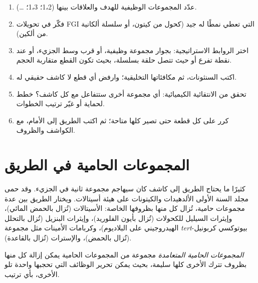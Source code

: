 \begin{method}\label{met:b2:retrosynthesis:retrosynthesis}
\begin{enumerate}
  \item عدّد المجموعات الوظيفية للهدف والعلاقات بينها (1،2؛ 1،3؛ \dots).
  \item فكّر في تحويلات FGI التي تعطي نمطًا له  جيد (كحول من كيتون، أو
        سلسلة ألكانية من ألكين).
  \item اختر الروابط الاستراتيجية: بجوار مجموعة وظيفية، أو قرب وسط الجزيء، أو عند
        نقطة تفرع أو حيث تتصل حلقة بسلسلة، بحيث تكون القطع متقاربة الحجم.
  \item اكتب السنثونات، ثم مكافئاتها التخليقية؛ وارفض أي قطع لا كاشف حقيقي له.
  \item تحقق من الانتقائية الكيميائية: أي مجموعة أخرى ستتفاعل مع كل كاشف؟ خطط لحماية
        أو غيّر ترتيب الخطوات.
  \item كرر على كل قطعة حتى تصير كلها متاحة؛ ثم اكتب الطريق إلى الأمام، مع الكواشف 
        والظروف.
\end{enumerate}
\end{method}

\section{المجموعات الحامية في الطريق}

كثيرًا ما يحتاج الطريق إلى كاشف كان سيهاجم مجموعة ثانية في الجزيء. وقد حمى مجلد السنة الأولى
الألدهيدات والكيتونات على هيئة أسيتالات. ويختار الطريق بين عدة مجموعات حامية، تُزال كل منها
بظروفها الخاصة: الأسيتالات (تُزال بالحمض المائي)، وإيثرات السيليل للكحولات (تُزال بأيون
الفلوريد)، وإيثرات البنزيل (تُزال بالتحلل الهيدروجيني على البلاديوم)، وكربامات الأمينات مثل
مجموعة \textit{tert}-بيوتوكسي كربونيل (تُزال بالحمض)، والإسترات (تُزال بالقاعدة).

\begin{definition}\label{def:b2:retrosynthesis:orthogonal}
\emph{المجموعات الحامية المتعامدة} مجموعة من المجموعات
الحامية يمكن إزالة كل منها بظروف تترك الأخرى كلها سليمة، بحيث يمكن تحرير الوظائف التي تحجبها
واحدة تلو الأخرى، بأي ترتيب.
\end{definition}


